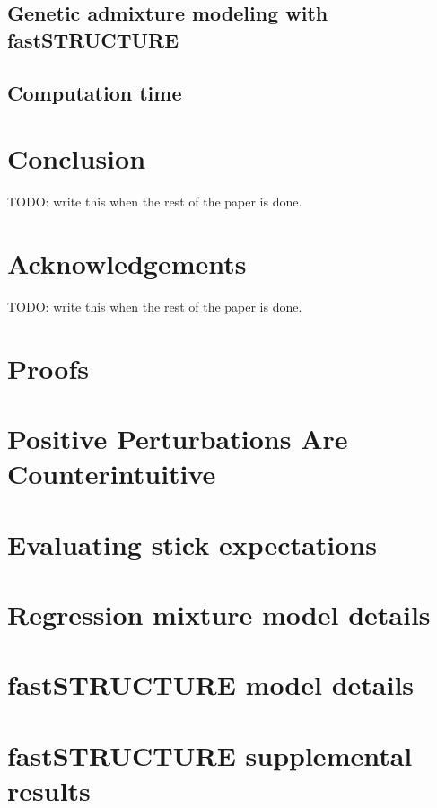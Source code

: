 \documentclass[11pt]{article}
\begin{document}
    \subsection{Genetic admixture modeling with fastSTRUCTURE}
    

    \subsection{Computation time}
    

\section{Conclusion}
TODO: write this when the rest of the paper is done.


\section{Acknowledgements}
TODO: write this when the rest of the paper is done.






\clearpage
\newpage

\appendix

\section{Proofs}


\section{Positive Perturbations Are Counterintuitive}


\section{Evaluating stick expectations}


\section{Regression mixture model details}


\section{fastSTRUCTURE model details}


\section{fastSTRUCTURE supplemental results}

\end{document}
